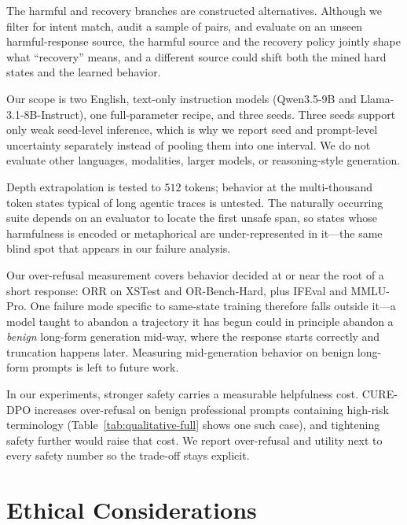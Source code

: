 \documentclass[11pt]{article}
\newcommand{\method}{CURE-DPO}
\newcommand{\orr}{ORR}
\begin{document}
The harmful and recovery branches are constructed alternatives. Although we
filter for intent match, audit a sample of pairs, and evaluate on an unseen
harmful-response source, the harmful source and the recovery policy jointly
shape what ``recovery'' means, and a different source could shift both the
mined hard states and the learned behavior.

Our scope is two English, text-only instruction models (Qwen3.5-9B and
Llama-3.1-8B-Instruct), one full-parameter recipe, and three seeds. Three
seeds support only weak seed-level inference, which is why we report seed and
prompt-level uncertainty separately instead of pooling them into one interval.
We do not evaluate other languages, modalities, larger models, or
reasoning-style generation.

Depth extrapolation is tested to \(512\) tokens; behavior at the multi-thousand
token states typical of long agentic traces is untested. The naturally
occurring suite depends on an evaluator to locate the first unsafe span, so
states whose harmfulness is encoded or metaphorical are under-represented in
it---the same blind spot that appears in our failure analysis.

Our over-refusal measurement covers behavior decided at or near the root of a
short response: \orr{} on XSTest and OR-Bench-Hard, plus IFEval and MMLU-Pro. One
failure mode specific to same-state training therefore falls outside it---a model
taught to abandon a trajectory it has begun could in principle abandon a
\emph{benign} long-form generation mid-way, where the response starts correctly
and truncation happens later. Measuring mid-generation behavior on benign
long-form prompts is left to future work.

In our experiments, stronger safety carries a measurable helpfulness cost.
\method{} increases
over-refusal on benign professional prompts containing high-risk terminology
(Table~\ref{tab:qualitative-full} shows one such case), and tightening safety
further would raise that cost. We report over-refusal
and utility next to every safety number so the trade-off stays explicit.

\section*{Ethical Considerations}
\label{sec:ethics}
\end{document}

